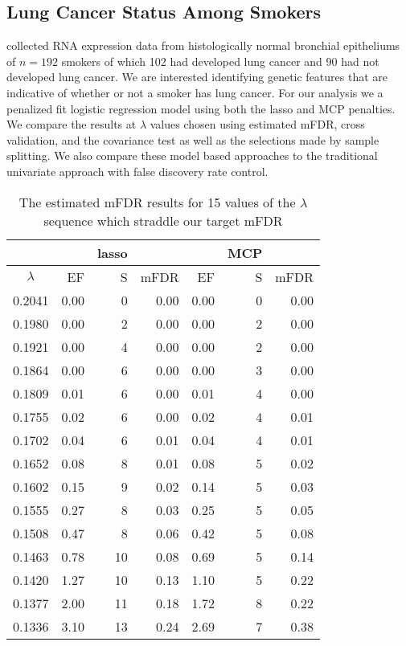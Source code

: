 \subsection{Lung Cancer Status Among Smokers}
\citet{Spira2007} collected RNA expression data from histologically normal bronchial epitheliums of $n = 192$ smokers of which 102 had developed lung cancer and 90 had not developed lung cancer.  We are interested identifying genetic features that are indicative of whether or not a smoker has lung cancer.  For our analysis we a penalized fit logistic regression model using both the lasso and MCP penalties. We compare the results at $\lambda$ values chosen using estimated mFDR, cross validation, and the covariance test as well as the selections made by sample splitting. We also compare these model based approaches to the traditional univariate approach with false discovery rate control.

\begin{table}[ht]
\centering
\begin{tabular}{c|rrr|rrr}
  \hline
 & & lasso & & & MCP & \\
 \hline
$\lambda$ & EF & S & mFDR & EF & S & mFDR \\ 
  \hline
0.2041 & 0.00 &   0 & 0.00 & 0.00 &   0 & 0.00 \\ 
  0.1980 & 0.00 &   2 & 0.00 & 0.00 &   2 & 0.00 \\ 
  0.1921 & 0.00 &   4 & 0.00 & 0.00 &   2 & 0.00 \\ 
  0.1864 & 0.00 &   6 & 0.00 & 0.00 &   3 & 0.00 \\ 
  0.1809 & 0.01 &   6 & 0.00 & 0.01 &   4 & 0.00 \\ 
  0.1755 & 0.02 &   6 & 0.00 & 0.02 &   4 & 0.01 \\ 
  0.1702 & 0.04 &   6 & 0.01 & 0.04 &   4 & 0.01 \\ 
  0.1652 & 0.08 &   8 & 0.01 & 0.08 &   5 & 0.02 \\ 
  0.1602 & 0.15 &   9 & 0.02 & 0.14 &   5 & 0.03 \\ 
  0.1555 & 0.27 &   8 & 0.03 & 0.25 &   5 & 0.05 \\ 
  0.1508 & 0.47 &   8 & 0.06 & 0.42 &   5 & 0.08 \\ 
  0.1463 & 0.78 &  10 & 0.08 & 0.69 &   5 & 0.14 \\ 
  0.1420 & 1.27 &  10 & 0.13 & 1.10 &   5 & 0.22 \\ 
  0.1377 & 2.00 &  11 & 0.18 & 1.72 &   8 & 0.22 \\ 
  0.1336 & 3.10 &  13 & 0.24 & 2.69 &   7 & 0.38 \\ 
   \hline
\end{tabular}
 \caption{The estimated mFDR results for 15 values of the $\lambda$ sequence which straddle our target mFDR}
\end{table}

